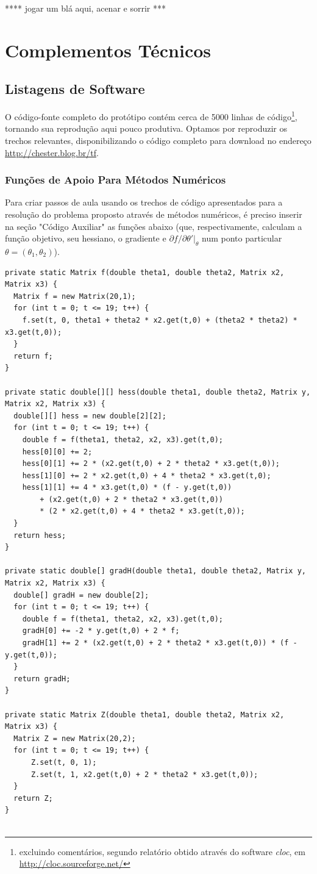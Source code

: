 \documentclass{abnt}
\newenvironment{mylisting}
{\begin{list}{}{\setlength{\leftmargin}{1em}}\item\scriptsize\bfseries}
{\end{list}}
\begin{document}
**** jogar um blá aqui, acenar e sorrir ***

\appendix
\chapter {Complementos Técnicos}
\section{Listagens de Software}
O código-fonte completo do protótipo contém cerca de 5000 linhas de código\footnote{excluindo comentários, segundo relatório obtido através do software \textit{cloc}, em \url{http://cloc.sourceforge.net/}}, tornando sua reprodução aqui pouco produtiva. Optamos por reproduzir os trechos relevantes, disponibilizando o código completo para download  no endereço \url{http://chester.blog.br/tf}.

\subsection{Funções de Apoio Para Métodos Numéricos}

Para criar passos de aula usando os trechos de código apresentados para a resolução do problema proposto através de métodos numéricos, é preciso inserir na seção "Código Auxiliar" as funções abaixo (que, respectivamente, calculam a função objetivo, seu hessiano, o gradiente e $\partial f/ \partial \theta'\vert_{\theta}$ num ponto particular $\theta=(\theta_1,\theta_2)$).

\begin{mylisting}
\begin{verbatim}
private static Matrix f(double theta1, double theta2, Matrix x2, Matrix x3) {
  Matrix f = new Matrix(20,1);
  for (int t = 0; t <= 19; t++) {
    f.set(t, 0, theta1 + theta2 * x2.get(t,0) + (theta2 * theta2) * x3.get(t,0));
  }
  return f;
}

private static double[][] hess(double theta1, double theta2, Matrix y, Matrix x2, Matrix x3) {
  double[][] hess = new double[2][2];
  for (int t = 0; t <= 19; t++) {
    double f = f(theta1, theta2, x2, x3).get(t,0);
    hess[0][0] += 2;
    hess[0][1] += 2 * (x2.get(t,0) + 2 * theta2 * x3.get(t,0));
    hess[1][0] += 2 * x2.get(t,0) + 4 * theta2 * x3.get(t,0);
    hess[1][1] += 4 * x3.get(t,0) * (f - y.get(t,0))
		+ (x2.get(t,0) + 2 * theta2 * x3.get(t,0))
		* (2 * x2.get(t,0) + 4 * theta2 * x3.get(t,0));
  }
  return hess;
}

private static double[] gradH(double theta1, double theta2, Matrix y, Matrix x2, Matrix x3) {
  double[] gradH = new double[2];
  for (int t = 0; t <= 19; t++) {
    double f = f(theta1, theta2, x2, x3).get(t,0);
    gradH[0] += -2 * y.get(t,0) + 2 * f;
    gradH[1] += 2 * (x2.get(t,0) + 2 * theta2 * x3.get(t,0)) * (f - y.get(t,0));
  }
  return gradH;
}

private static Matrix Z(double theta1, double theta2, Matrix x2, Matrix x3) {
  Matrix Z = new Matrix(20,2);
  for (int t = 0; t <= 19; t++) {
      Z.set(t, 0, 1);
      Z.set(t, 1, x2.get(t,0) + 2 * theta2 * x3.get(t,0));
  }
  return Z;
}


\end{verbatim}
\end{mylisting}
\end{document}
